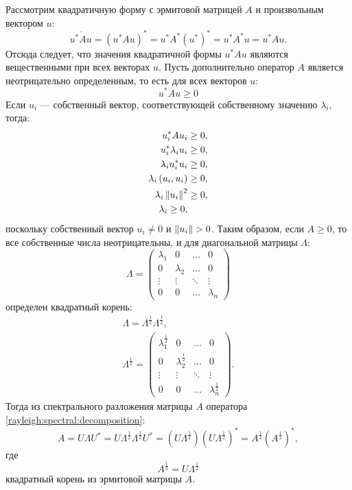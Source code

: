 Рассмотрим квадратичную форму с эрмитовой матрицей $A$ и произвольным вектором $u$:
\[
    \overline{u^* A u}
    = \left ( u^* A u \right )^*
    = u^* A^* (u^*)^*
    = u^* A^* u
    = u^* A u .
\]
Отсюда следует, что значения квадратичной формы $u^* A u$ являются вещественными при всех векторах $u$. Пусть дополнительно оператор $A$
является неотрицательно определенным, то есть для всех векторов $u$:
\[
    u^* A u \ge 0
\]
Если $u_i$ --- собственный вектор, соответствующей собственному значению $\lambda_i$, тогда:
\begin{align*}
    u_i^* A u_i & \ge 0 , \\
    u_i^* \lambda_i u_i & \ge 0 , \\
    \lambda_i u_i^* u_i & \ge 0 , \\
    \lambda_i \left ( u_i, u_i \right ) & \ge 0 , \\
    \lambda_i \left \| u_i \right \|^2 & \ge 0 , \\
    \lambda_i \ge 0 ,
\end{align*}
поскольку собственный вектор $u_i \neq 0$ и $\left \| u_i \right \| > 0$. Таким образом, если $A \ge 0$, то все собственные числа неотрицательны, и для диагональной
матрицы $\Lambda$:
\[
    \Lambda
    = \begin{pmatrix}
          \lambda_1 & 0         & \dots  & 0         \\
          0         & \lambda_2 & \dots  & 0         \\
          \vdots    & \vdots    & \ddots & \vdots    \\
          0         & 0         & \dots  & \lambda_n
    \end{pmatrix}
\]
определен квадратный корень:
\begin{gather*}
    \Lambda = \Lambda^{\frac{1}{2}} \Lambda^{\frac{1}{2}} , \\
    \Lambda^\frac{1}{2}
    = \begin{pmatrix}
          \lambda_1^\frac{1}{2} & 0                     & \dots  & 0                     \\
          0                     & \lambda_2^\frac{1}{2} & \dots  & 0                     \\
          \vdots                & \vdots                & \ddots & \vdots                \\
          0                     & 0                     & \dots  & \lambda_n^\frac{1}{2}
    \end{pmatrix}
    .
\end{gather*}
Тогда из спектрального разложения матрицы $A$ оператора \eqref{rayleigh:spectral:decomposition}:
\[
    A
    = U \Lambda U^*
    = U \Lambda^\frac{1}{2} \Lambda^\frac{1}{2} U^*
    = \left ( U \Lambda^\frac{1}{2} \right ) \left ( U \Lambda^\frac{1}{2} \right )^*
    = A^\frac{1}{2} \left ( A^\frac{1}{2} \right )^*,
\]
где
\[
    A^\frac{1}{2} = U \Lambda^\frac{1}{2}
\]
квадратный корень из эрмитовой матрицы $A$.

